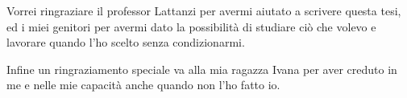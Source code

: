 \documentclass[a4paper,singleside,11pt]{report}
\begin{document}

\copertinatesi
{}
\indice
\indicefigure
\iniziatesto





%

\appendix
%


\ringraziamenti
Vorrei ringraziare il professor Lattanzi per avermi aiutato a scrivere questa tesi, ed i miei genitori per avermi dato la possibilit\`a di studiare ci\`o che volevo e lavorare quando l'ho scelto senza condizionarmi.

Infine un ringraziamento speciale va alla mia ragazza Ivana per aver creduto in me e nelle mie capacit\`a anche quando non l'ho fatto io.
\end{document}
